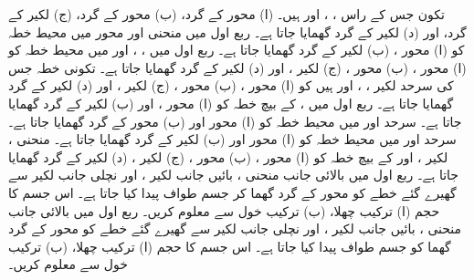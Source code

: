 تکون جس کے راس ، ، اور  ہیں۔ (ا) محور  کے گرد، (ب) محور  کے گرد، (ج) لکیر  کے گرد، اور (د) لکیر  کے گرد گھمایا جاتا ہے۔
ربع اول میں منحنی  اور محور  میں محیط خطہ کو (ا) محور ، (ب) لکیر  کے گرد گھمایا جاتا ہے۔
ربع اول میں ، ، اور  میں محیط خطہ کو (ا) محور ، (ب) محور ، (ج) لکیر ، اور (د) لکیر  کے گرد گھمایا جاتا ہے۔
تکونی خطہ جس کی سرحد لکیر ، ، اور  ہیں کو (ا) محور ، (ب) محور ، (ج) لکیر ، اور (د) لکیر  کے گرد گھمایا جاتا ہے۔
ربع اول میں ،  کے بیچ خطہ کو (ا) محور ، اور (ب) لکیر  کے گرد گھمایا جاتا ہے۔
سرحد  اور  میں محیط خطہ کو (ا) محور  اور (ب) محور  کے گرد گھمایا جاتا ہے۔
سرحد  اور  میں محیط خطہ کو (ا) محور  اور (ب) لکیر  کے گرد گھمایا جاتا ہے۔
منحنی ، لکیر ،  اور  کے بیچ خطہ کو (ا) محور ، (ب) محور ، (ج) لکیر ، (د) لکیر  کے گرد گھمایا جاتا ہے۔
ربع اول میں بالائی جانب منحنی ، بائیں جانب لکیر ، اور نچلی جانب لکیر  سے گھیرے گئے خطے کو محور  کے گرد گھما کر جسم طواف پیدا کیا جاتا ہے۔ اس جسم کا حجم (ا) ترکیب چھلا، (ب) ترکیب خول سے معلوم کریں۔
ربع اول میں بالائی جانب منحنی ، بائیں جانب لکیر ، اور نچلی جانب لکیر  سے گھیرے گئے خطے کو محور  کے گرد گھما کو جسم طواف پیدا کیا جاتا ہے۔ اس جسم کا حجم (ا) ترکیب چھلا، (ب) ترکیب خول سے معلوم کریں۔
